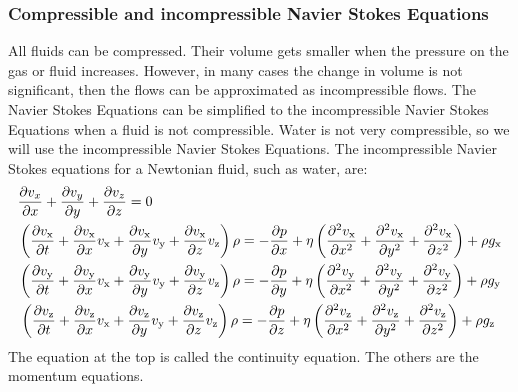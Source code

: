 \documentclass{article}
\begin{document}
\subsubsection{Compressible and incompressible Navier Stokes Equations}
All fluids can be compressed. Their volume gets smaller when the pressure on the gas or fluid increases. However, in many cases the change in volume is not significant, then the flows can be approximated as incompressible flows. The Navier Stokes Equations can be simplified to the incompressible Navier Stokes Equations when a fluid is not compressible. Water is not very compressible\cite{NSE features}, so we will use the incompressible Navier Stokes Equations. The incompressible Navier Stokes equations for a Newtonian fluid, such as water, are:\cite{Navier Stokes incompressible} \cite{NASA NSE}
\begin{equation}
\begin{aligned}
&\pdv{v_{x}}{x}+\pdv{v_{y}}{y}+\pdv{v_{z}}{z}=0\\
&\left(\frac{\partial v_{\mathrm{x}}}{\partial t}+\frac{\partial v_{\mathrm{x}}}{\partial x} v_{\mathrm{x}}+\frac{\partial v_{\mathrm{x}}}{\partial y} v_{\mathrm{y}}+\frac{\partial v_{\mathrm{x}}}{\partial z} v_{\mathrm{z}}\right) \rho=-\frac{\partial p}{\partial x}+\eta\left(\frac{\partial^{2} v_{\mathrm{x}}}{\partial x^{2}}+\frac{\partial^{2} v_{\mathrm{x}}}{\partial y^{2}}+\frac{\partial^{2} v_{\mathrm{x}}}{\partial z^{2}}\right)+\rho g_{\mathrm{x}}\\
&\left(\frac{\partial v_{\mathrm{y}}}{\partial t}+\frac{\partial v_{\mathrm{y}}}{\partial x} v_{\mathrm{x}}+\frac{\partial v_{\mathrm{y}}}{\partial y} v_{\mathrm{y}}+\frac{\partial v_{\mathrm{y}}}{\partial z} v_{\mathrm{z}}\right) \rho=-\frac{\partial p}{\partial y}+\eta\left(\frac{\partial^{2} v_{\mathrm{y}}}{\partial x^{2}}+\frac{\partial^{2} v_{\mathrm{y}}}{\partial y^{2}}+\frac{\partial^{2} v_{\mathrm{y}}}{\partial z^{2}}\right)+\rho g_{\mathrm{y}}\\
&\left . \left(\frac{\partial v_{\mathrm{z}}}{\partial t}+\frac{\partial v_{\mathrm{z}}}{\partial x} v_{\mathrm{x}}+\frac{\partial v_{\mathrm{z}}}{\partial y} v_{\mathrm{y}}+\frac{\partial v_{\mathrm{z}}}{\partial z} v_{\mathrm{z}}\right) \rho=-\frac{\partial p}{\partial z}+\eta\left(\frac{\partial^{2} v_{\mathrm{z}}}{\partial x^{2}}+\frac{\partial^{2} v_{\mathrm{z}}}{\partial y^{2}}+\frac{\partial^{2} v_{\mathrm{z}}}{\partial z^{2}}\right)+\rho g_{\mathrm{z}}\right .
\end{aligned}
\label{NSE incompressible}
\end{equation}
The equation at the top is called the continuity equation. The others are the momentum equations.
\end{document}
